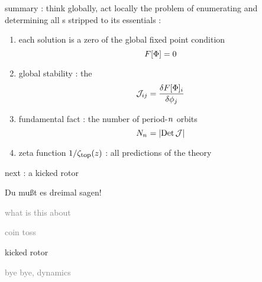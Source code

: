 \begin{frame}{summary : think globally, act locally}
\bigskip
the problem of enumerating and determining all {\color{blue}{\lattstate}s}
stripped to its essentials :
\bigskip
\begin{enumerate}
              \item
each solution is a zero of the global {\color{blue}fixed point} condition
\[
F[\Phi] = 0
\]
              \item
{\color{blue}global stability} :  the {\jacobianOrb}
\[
{\cal J}_{ij} =\frac{\delta F[\Phi]_i}{\delta \phi_j}
\]
              \item
{\color{blue}fundamental fact} : the number of period-${n_{}}$ orbits
\[
N_{n_{}} = |\mbox{\rm Det}\,{\cal J}|
\]

              \item
{\color{blue}zeta function} $1/\zeta_{\mbox{\footnotesize top}} (z)$ : all predictions of the theory
            \end{enumerate}
\end{frame} %

\begin{frame}{next : a kicked rotor} %
\begin{bartlett}{
Du mu{\ss}t es dreimal sagen!
        }
\end{bartlett}
\vfill
\begin{enumerate}
              \item \textcolor{gray}{\small
{}
{what is this about}
              \item
{}
{coin toss}
                  }
              \item {\Large
{}
{kicked rotor}
                  }\textcolor{gray}{\small
              \item
{}
{\catlatt}
              \item
{}
{bye bye, dynamics}
                    }
            \end{enumerate}
\end{frame} %


